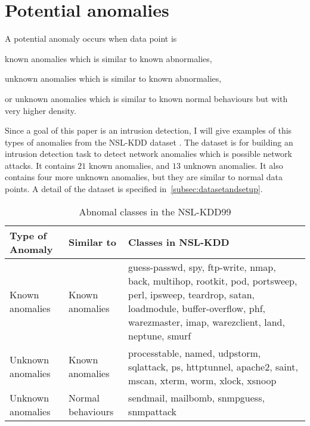 \section{Potential anomalies}
A potential anomaly occurs when data point is \begin{inparaenum}
\item known anomalies which is similar to known abnormalies, %
\item unknown anomalies which is similar to known abnormalies, %
\item or unknown anomalies which is similar to known normal behaviours but with very higher density.
\end{inparaenum} 

Since a goal of this paper is an intrusion detection, I will give examples of this types of anomalies from the NSL-KDD dataset \cite{tavallaee09}. 
The dataset is for building an intrusion detection task to detect network anomalies which is possible network attacks. 
It contains $21$ known anomalies, and $13$ unknown anomalies. 
It also contains four more unknown anomalies, but they are similar to normal data points.
A detail of the dataset is specified in~\ref{subsec:datasetandsetup}. 

\begin{table}[h]
\begin{center}
\begin{tabular}{| l | l | p{5cm} |}
\hline
Type of Anomaly & Similar to & Classes in NSL-KDD \\
\hline
Known anomalies & Known anomalies & guess-passwd, spy, ftp-write, nmap, back, multihop, rootkit, pod, portsweep, perl, ipsweep, teardrop, satan, loadmodule, buffer-overflow, phf, warezmaster, imap, warezclient, land, neptune, smurf \\ %
\hline
Unknown anomalies & Known anomalies & processtable, named, udpstorm, sqlattack, ps, httptunnel, apache2, saint, mscan, xterm, worm, xlock, xsnoop \\ %
\hline
Unknown anomalies & Normal behaviours & sendmail, mailbomb, snmpguess, snmpattack \\ %
\hline
\end{tabular}
\end{center}
\caption{Abnomal classes in the NSL-KDD99}
\label{fig:anomalyclasses}
\end{table}
